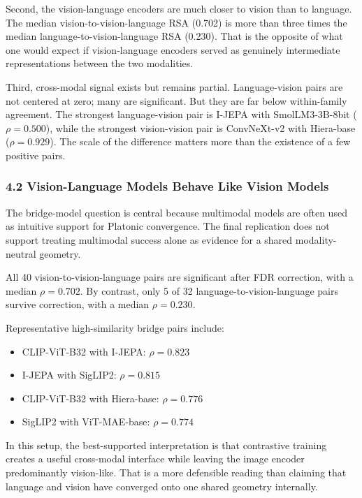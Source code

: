 \documentclass[
]{article}
\providecommand{\tightlist}{%
  \setlength{\itemsep}{0pt}\setlength{\parskip}{0pt}}
\begin{document}
Second, the vision-language encoders are much closer to vision than to
language. The median vision-to-vision-language RSA (0.702) is more than
three times the median language-to-vision-language RSA (0.230). That is
the opposite of what one would expect if vision-language encoders served
as genuinely intermediate representations between the two modalities.

Third, cross-modal signal exists but remains partial. Language-vision
pairs are not centered at zero; many are significant. But they are far
below within-family agreement. The strongest language-vision pair is
I-JEPA with SmolLM3-3B-8bit (\(\rho = 0.500\)), while the strongest
vision-vision pair is ConvNeXt-v2 with Hiera-base (\(\rho = 0.929\)).
The scale of the difference matters more than the existence of a few
positive pairs.

\subsubsection{4.2 Vision-Language Models Behave Like Vision
Models}\label{vision-language-models-behave-like-vision-models}

The bridge-model question is central because multimodal models are often
used as intuitive support for Platonic convergence. The final
replication does not support treating multimodal success alone as
evidence for a shared modality-neutral geometry.

All 40 vision-to-vision-language pairs are significant after FDR
correction, with a median \(\rho = 0.702\). By contrast, only 5 of 32
language-to-vision-language pairs survive correction, with a median
\(\rho = 0.230\).

Representative high-similarity bridge pairs include:

\begin{itemize}
\tightlist
\item
  CLIP-ViT-B32 with I-JEPA: \(\rho = 0.823\)
\item
  I-JEPA with SigLIP2: \(\rho = 0.815\)
\item
  CLIP-ViT-B32 with Hiera-base: \(\rho = 0.776\)
\item
  SigLIP2 with ViT-MAE-base: \(\rho = 0.774\)
\end{itemize}

In this setup, the best-supported interpretation is that contrastive
training creates a useful cross-modal interface while leaving the image
encoder predominantly vision-like. That is a more defensible reading
than claiming that language and vision have converged onto one shared
geometry internally.
\end{document}
